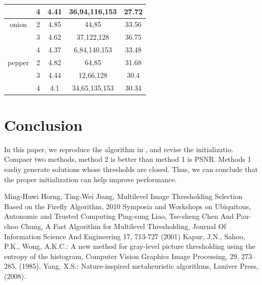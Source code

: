 \documentclass[conference]{IEEEtran}
\begin{document}
\begin{table}[htbp]
\begin{center}
\begin{tabular}{|c|c|c|c|c|}
    \hline
    & 4 & 4.41 & 36,94,116,153 & 27.72\\
    \hline
    onion & 2 & 4.85 & 44,85 & 33.56\\
    \hline
    & 3 & 4.62 & 37,122,128 & 36.75\\
    \hline
    & 4 & 4.37 & 6,84,140,153 & 33.48\\
    \hline
    pepper & 2 & 4.82 & 64,85 & 31.68\\
    \hline
    & 3 & 4.44 & 12,66,128 & 30.4\\
    \hline
    & 4 & 4.1 & 34,65,135,153 & 30.34\\
    \hline
\end{tabular}
\label{dataset_sample}
\end{center}
\end{table}
  
\section{Conclusion}
In  this paper, we reproduce the algorithm in \cite{b1}, and revise the initializatio. Compaer two methods, method 2 is better than method 1 is PSNR. Methods 1 easliy generate solutions whose thresholds are closed. Thus, we can conclude that the proper initialization can help improve performance.

\begin{thebibliography}{00}
 Ming-Huwi Horng, Ting-Wei Jiang, Multilevel Image Thresholding Selection Based on the Firefly Algorithm, 2010 Symposia and Workshops on Ubiquitous, Autonomic and Trusted Computing
 Ping-sung Liao, Tse-sheng Chen And Pau-choo Chung, A Fast Algorithm for Multilevel Thresholding, Journal Of Information Science And Engineering 17, 713-727 (2001)
 Kapur, J.N., Sahoo, P.K., Wong, A.K.C.: A new method for gray-level picture thresholding using the entropy of the histogram, Computer Vision Graphics Image Processing, 29, 273--285, (1985).
 Yang, X.S.: Nature-inspired metaheuristic algorithms, Luniver Press,
(2008).
\end{thebibliography}
\vspace{12pt}
\end{document}
